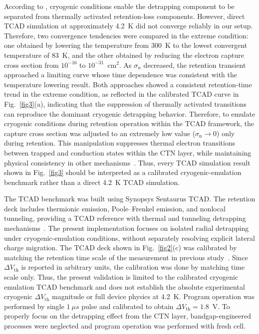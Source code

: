 \documentclass[journal,twoside,web]{ieeecolor}
\begin{document}
According to \cite{Refaldi.IRPS2025}, cryogenic conditions enable the detrapping component to be {separated from thermally activated retention-loss components}.
However, direct TCAD simulation at {approximately 4.2~K} did not converge reliably in our setup.
{Therefore, two convergence tendencies were compared in the extreme condition: one obtained by lowering the temperature {from 300~K to} the lowest convergent {temperature of 83~K}, and the other obtained by reducing the electron capture cross section {from $10^{-16}$ to $10^{-31}$~cm$^2$}.}
{As $\sigma_n$ decreased, the retention transient approached a limiting curve whose time dependence was consistent with the temperature lowering result.}
{Both approaches showed a consistent retention-time trend in the extreme condition, as reflected in the calibrated TCAD curve in Fig.~\ref{fig3}(a), indicating that the suppression of thermally activated transitions can reproduce the dominant cryogenic detrapping behavior.}
Therefore, to emulate cryogenic conditions during retention operation within the TCAD framework, the capture cross section was adjusted to an extremely low value ($\sigma_\mathrm{n} \rightarrow 0$) only during retention.
This manipulation suppresses thermal electron transitions between trapped and conduction states within the CTN layer, while maintaining physical consistency in other mechanisms~\cite{TCADmanual.2022}.
{Thus, every TCAD simulation result shown in \hbox{Fig.~\ref{fig3}} should be interpreted as a calibrated cryogenic-emulation benchmark rather than a direct 4.2~K TCAD simulation.}

{The TCAD benchmark was built using Synopsys Sentaurus TCAD.}
{The retention deck includes thermionic emission, Poole--Frenkel emission, and nonlocal tunneling, providing a TCAD reference with thermal and tunneling detrapping mechanisms~\hbox{\cite{TCADmanual.2022}}.}
{The present implementation focuses on isolated radial detrapping under cryogenic-emulation conditions, without separately resolving explicit lateral charge migration.}
The TCAD deck shown in Fig.~\ref{fig2}(c) was calibrated by matching the retention time scale of the measurement in previous study~\cite{Refaldi.IRPS2025}.
Since $\Delta V_\text{th}$ is reported in arbitrary units, the calibration was done by matching time scale only.
{Thus, the present validation is limited to the calibrated cryogenic emulation TCAD benchmark and does not establish the absolute experimental cryogenic $\Delta V_\text{th}$ magnitude or full device physics at 4.2~K.}
Program operation was performed by single $1~\mu s$ pulse and calibrated to obtain $\Delta V_\text{th} = 1.8$~V.
To properly focus on the detrapping effect from the CTN layer, bandgap-engineered processes were neglected and program operation was performed with fresh cell.
\end{document}
